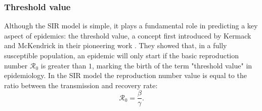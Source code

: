 \subsubsection{Threshold value}
\label{subsub:threshold}
Although the SIR model is simple, it plays a fundamental role in predicting a key aspect of epidemics: the threshold value, a concept first introduced by Kermack and McKendrick in their pioneering work \cite{kermack1927}. They showed that, in a fully susceptible population, an epidemic will only start if the basic reproduction number $\mathcal{R}_0$ is greater than $1$, marking the birth of the term "threshold value" in epidemiology.
In the SIR model the reproduction number value is equal to the ratio between the transmission and recovery rate:
\begin{equation}
	\mathcal{R}_0 = \frac{\beta}{\gamma}. 
	\label{eq_basic_reproduction_number}
\end{equation}

